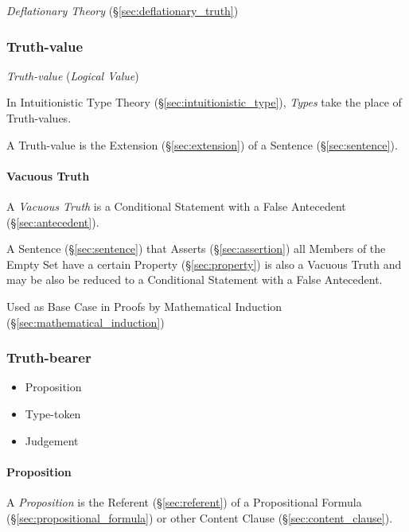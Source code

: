 \emph{Deflationary Theory} (\S\ref{sec:deflationary_truth})



\subsubsection{Truth-value}\label{sec:truth_value}

\emph{Truth-value} (\emph{Logical Value})

In Intuitionistic Type Theory (\S\ref{sec:intuitionistic_type}),
\emph{Types} take the place of Truth-values.

A Truth-value is the Extension (\S\ref{sec:extension}) of a Sentence
(\S\ref{sec:sentence}).



\paragraph{Vacuous Truth}\label{sec:vacuous_truth}\hfill

A \emph{Vacuous Truth} is a Conditional Statement with a False
Antecedent (\S\ref{sec:antecedent}).

A Sentence (\S\ref{sec:sentence}) that Asserts (\S\ref{sec:assertion})
all Members of the Empty Set have a certain Property
(\S\ref{sec:property}) is also a Vacuous Truth and may be also be
reduced to a Conditional Statement with a False Antecedent.

Used as Base Case in Proofs by Mathematical Induction
(\S\ref{sec:mathematical_induction})



\subsubsection{Truth-bearer}\label{sec:truth_bearer}

\begin{itemize}
  \item Proposition
  \item Type-token
  \item Judgement
\end{itemize}



\paragraph{Proposition}\label{sec:proposition}\hfill

A \emph{Proposition} is the Referent (\S\ref{sec:referent}) of a
Propositional Formula (\S\ref{sec:propositional_formula}) or other
Content Clause (\S\ref{sec:content_clause}).



